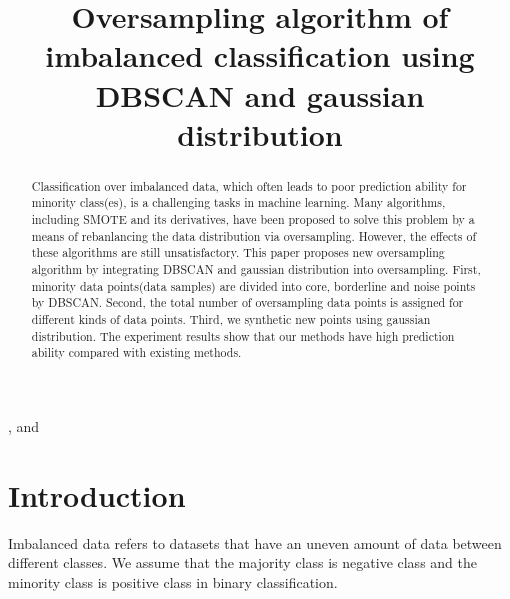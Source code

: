 \documentclass[ida]{iosart2x}
\begin{document}
\begin{frontmatter} %

%
\title{Oversampling algorithm of imbalanced classification using DBSCAN and gaussian distribution}


\author[A]{ },
and
\author[B]{ }

\address[A]{Harbin Institute of Technology }
\address[B]{Harbin Institute of Technology }

\begin{abstract}
  Classification over imbalanced data, which often leads to poor prediction ability for 
  minority class(es), is a challenging tasks in machine learning.
  Many algorithms, including SMOTE and its derivatives, 
  have been proposed to
  solve this problem by a means of rebanlancing the data distribution via oversampling. However, 
  the effects of these algorithms are still unsatisfactory. This paper proposes
  new oversampling algorithm by integrating DBSCAN and gaussian distribution into oversampling.  
  First, minority data points(data samples) are
  divided into core, borderline and noise points by DBSCAN. 
  Second, the total number of oversampling data points is
  assigned for different kinds of data points. Third, 
  we synthetic new points using gaussian distribution.
  The experiment results
  show that our methods have high prediction ability compared with existing methods.
\end{abstract}

\begin{keyword}
\end{keyword}
\end{frontmatter}




\section{Introduction}
Imbalanced data\cite{2004Editorial} refers to datasets that have an uneven 
amount of data between different classes. 
We assume that the majority class is negative class and 
the minority class is positive class in binary classification.
\end{document}

